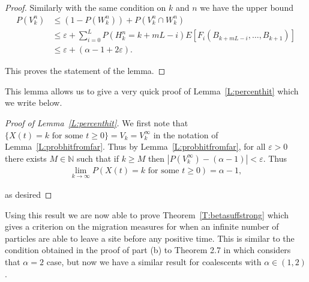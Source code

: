 \documentclass[11pt]{article}
\theoremstyle{definition}
\newcommand{\N}{\mathbb{N}}
\newcommand{\thmref}[1]{Theorem~\ref{T:#1}}
\newcommand{\lemref}[1]{Lemma~\ref{L:#1}}
\begin{document}
\begin{proof}
    \noindent Similarly with the same condition on $k$ and $n$ we have the upper bound
    \begin{align*}
        P(V_k^n) &\leq  (1-P(W_k^n)) + P(V_k^n \cap W_k^n) \\
        &\leq \varepsilon + \sum_{i = 0}^L P(H_k^n = k + mL - i) E[F_i(B_{k+mL - i}, \ldots, B_{k+1})]\\
        &\leq \varepsilon + (\alpha - 1 + 2\varepsilon).
    \end{align*}

    \noindent This proves the statement of the lemma.
\end{proof}

\noindent This lemma allows us to give a very quick proof of \lemref{percenthit} which we write below.

\begin{proof}[Proof of \lemref{percenthit}]
    \noindent We first note that $\{X(t) = k \text{ for some } t \geq 0\} = V_k = V_k^\infty$ in the notation of \lemref{probhitfromfar}. Thus by \lemref{probhitfromfar}, for all $\varepsilon > 0$ there exists $M \in \N$ such that if $k \geq M$ then $|P(V_k^\infty) - (\alpha - 1)| < \varepsilon$. Thus
    \begin{align*}
        \lim_{k \to \infty}P(X(t) = k \text{ for some } t \geq 0) = \alpha -1,
    \end{align*}

    \noindent as desired
\end{proof}

\noindent Using this result we are now able to prove \thmref{betasuffstrong} which gives a criterion on the migration measures for when an infinite number of particles are able to leave a site before any positive time. This is similar to the condition obtained in the proof of part (b) to Theorem 2.7 in \cite{seedbank2} which considers that $\alpha = 2$ case, but now we have a similar result for coalescents with $\alpha \in (1,2)$.
\end{document}
